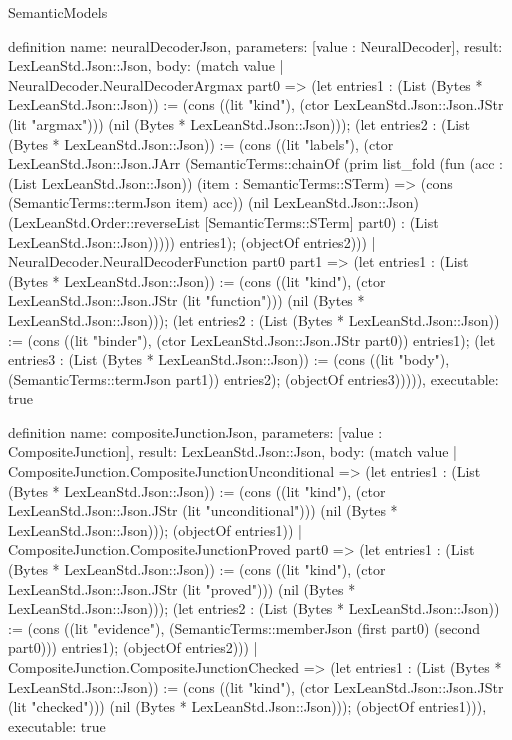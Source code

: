 \begin{lexlean}{SemanticModels}
\begin{semanticmodule}
definition{
  name: neuralDecoderJson,
  parameters: [value : NeuralDecoder],
  result: LexLeanStd.Json::Json,
  body: (match value
    | NeuralDecoder.NeuralDecoderArgmax part0 => (let entries1 : (List (Bytes * LexLeanStd.Json::Json)) := (cons ((lit "kind"), (ctor LexLeanStd.Json::Json.JStr (lit "argmax"))) (nil (Bytes * LexLeanStd.Json::Json))); (let entries2 : (List (Bytes * LexLeanStd.Json::Json)) := (cons ((lit "labels"), (ctor LexLeanStd.Json::Json.JArr (SemanticTerms::chainOf (prim list_fold (fun (acc : (List LexLeanStd.Json::Json)) (item : SemanticTerms::STerm) => (cons (SemanticTerms::termJson item) acc)) (nil LexLeanStd.Json::Json) (LexLeanStd.Order::reverseList [SemanticTerms::STerm] part0) : (List LexLeanStd.Json::Json))))) entries1); (objectOf entries2)))
    | NeuralDecoder.NeuralDecoderFunction part0 part1 => (let entries1 : (List (Bytes * LexLeanStd.Json::Json)) := (cons ((lit "kind"), (ctor LexLeanStd.Json::Json.JStr (lit "function"))) (nil (Bytes * LexLeanStd.Json::Json))); (let entries2 : (List (Bytes * LexLeanStd.Json::Json)) := (cons ((lit "binder"), (ctor LexLeanStd.Json::Json.JStr part0)) entries1); (let entries3 : (List (Bytes * LexLeanStd.Json::Json)) := (cons ((lit "body"), (SemanticTerms::termJson part1)) entries2); (objectOf entries3))))),
  executable: true
}

definition{
  name: compositeJunctionJson,
  parameters: [value : CompositeJunction],
  result: LexLeanStd.Json::Json,
  body: (match value
    | CompositeJunction.CompositeJunctionUnconditional => (let entries1 : (List (Bytes * LexLeanStd.Json::Json)) := (cons ((lit "kind"), (ctor LexLeanStd.Json::Json.JStr (lit "unconditional"))) (nil (Bytes * LexLeanStd.Json::Json))); (objectOf entries1))
    | CompositeJunction.CompositeJunctionProved part0 => (let entries1 : (List (Bytes * LexLeanStd.Json::Json)) := (cons ((lit "kind"), (ctor LexLeanStd.Json::Json.JStr (lit "proved"))) (nil (Bytes * LexLeanStd.Json::Json))); (let entries2 : (List (Bytes * LexLeanStd.Json::Json)) := (cons ((lit "evidence"), (SemanticTerms::memberJson (first part0) (second part0))) entries1); (objectOf entries2)))
    | CompositeJunction.CompositeJunctionChecked => (let entries1 : (List (Bytes * LexLeanStd.Json::Json)) := (cons ((lit "kind"), (ctor LexLeanStd.Json::Json.JStr (lit "checked"))) (nil (Bytes * LexLeanStd.Json::Json))); (objectOf entries1))),
  executable: true
}


\end{semanticmodule}
\end{lexlean}
